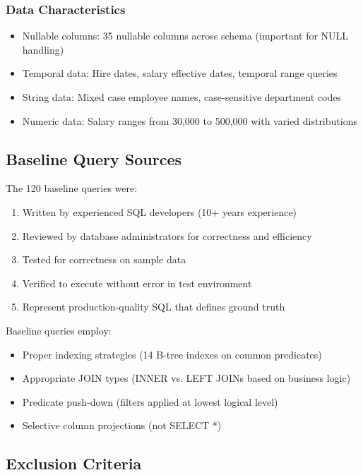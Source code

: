 \subsubsection{Data Characteristics}
\begin{itemize}
    \item Nullable columns: 35 nullable columns across schema (important for NULL handling)
    \item Temporal data: Hire dates, salary effective dates, temporal range queries
    \item String data: Mixed case employee names, case-sensitive department codes
    \item Numeric data: Salary ranges from 30,000 to 500,000 with varied distributions
\end{itemize}

\subsection{Baseline Query Sources}

The 120 baseline queries were:

\begin{enumerate}
    \item Written by experienced SQL developers (10+ years experience)
    \item Reviewed by database administrators for correctness and efficiency
    \item Tested for correctness on sample data
    \item Verified to execute without error in test environment
    \item Represent production-quality SQL that defines ground truth
\end{enumerate}

Baseline queries employ:
\begin{itemize}
    \item Proper indexing strategies (14 B-tree indexes on common predicates)
    \item Appropriate JOIN types (INNER vs. LEFT JOINs based on business logic)
    \item Predicate push-down (filters applied at lowest logical level)
    \item Selective column projections (not SELECT *)
\end{itemize}

\subsection{Exclusion Criteria}

